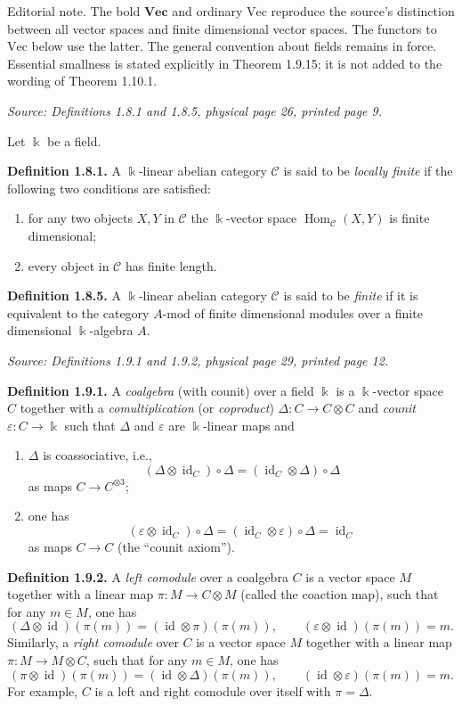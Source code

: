 \documentclass[11pt]{article}
\newcommand{\kk}{\Bbbk}
\newcommand{\cC}{\mathcal{C}}
\newcommand{\FiniteVec}{\mathrm{Vec}}
\newcommand{\AllVec}{\mathbf{Vec}}
\newcommand{\Hom}{\operatorname{Hom}}
\newcommand{\id}{\operatorname{id}}
\newcommand{\modu}{\mathrm{mod}}
\newcommand{\sourceloc}[1]{\par\smallskip\noindent\textit{Source: #1.}\par\smallskip}
\newcommand{\editorial}[1]{\par\smallskip\noindent\textsf{Editorial note.} #1\par\smallskip}
\begin{document}
\editorial{The bold $\AllVec$ and ordinary $\FiniteVec$ reproduce the source's
distinction between all vector spaces and finite dimensional vector spaces.
The functors to $\FiniteVec$ below use the latter. The general convention about
fields remains in force. Essential smallness is stated explicitly in
Theorem 1.9.15; it is not added to the wording of Theorem 1.10.1.}

\sourceloc{Definitions 1.8.1 and 1.8.5, physical page 26, printed page 9}
Let $\kk$ be a field.

\noindent\textbf{Definition 1.8.1.}
A $\kk$-linear abelian category $\cC$ is said to be \emph{locally finite}
if the following two conditions are satisfied:
\begin{enumerate}
\item[(i)] for any two objects $X,Y$ in $\cC$ the $\kk$-vector space
  $\Hom_{\cC}(X,Y)$ is finite dimensional;
\item[(ii)] every object in $\cC$ has finite length.
\end{enumerate}

\noindent\textbf{Definition 1.8.5.}
A $\kk$-linear abelian category $\cC$ is said to be \emph{finite} if it is
equivalent to the category $A$-$\modu$ of finite dimensional modules over
a finite dimensional $\kk$-algebra $A$.

\sourceloc{Definitions 1.9.1 and 1.9.2, physical page 29, printed page 12}
\noindent\textbf{Definition 1.9.1.}
A \emph{coalgebra} (with counit) over a field $\kk$ is a $\kk$-vector space
$C$ together with a \emph{comultiplication} (or \emph{coproduct})
$\Delta:C\to C\otimes C$ and \emph{counit} $\varepsilon:C\to\kk$ such
that $\Delta$ and $\varepsilon$ are $\kk$-linear maps and
\begin{enumerate}
\item[(i)] $\Delta$ is coassociative, i.e.,
  \[
  (\Delta\otimes\id_C)\circ\Delta
  =(\id_C\otimes\Delta)\circ\Delta
  \]
  as maps $C\to C^{\otimes 3}$;
\item[(ii)] one has
  \[
  (\varepsilon\otimes\id_C)\circ\Delta
  =(\id_C\otimes\varepsilon)\circ\Delta=\id_C
  \]
  as maps $C\to C$ (the ``counit axiom'').
\end{enumerate}

\noindent\textbf{Definition 1.9.2.}
A \emph{left comodule} over a coalgebra $C$ is a vector space $M$ together
with a linear map $\pi:M\to C\otimes M$ (called the coaction map), such
that for any $m\in M$, one has
\[
(\Delta\otimes\id)(\pi(m))=(\id\otimes\pi)(\pi(m)),
\qquad (\varepsilon\otimes\id)(\pi(m))=m.
\]
Similarly, a \emph{right comodule} over $C$ is a vector space $M$ together
with a linear map $\pi:M\to M\otimes C$, such that for any $m\in M$, one has
\[
(\pi\otimes\id)(\pi(m))=(\id\otimes\Delta)(\pi(m)),
\qquad (\id\otimes\varepsilon)(\pi(m))=m.
\]
For example, $C$ is a left and right comodule over itself with $\pi=\Delta$.
\end{document}
